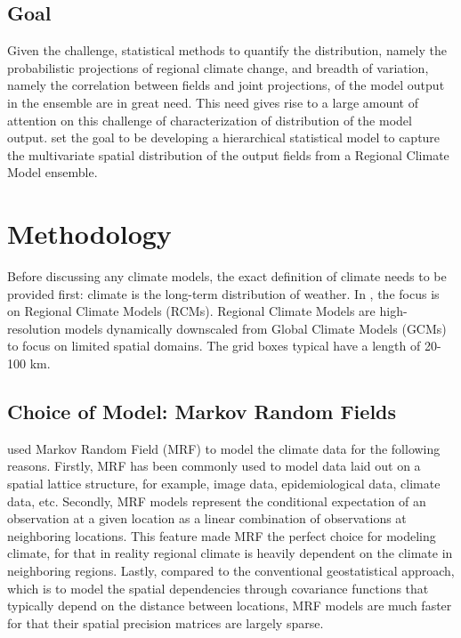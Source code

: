 \documentclass{article}
\begin{document}
\subsection{Goal}
Given the challenge, statistical methods to quantify the distribution, namely the probabilistic projections of regional climate change, and breadth of variation, namely the correlation between fields and joint projections, of the model output in the ensemble are in great need. This need gives rise to a large amount of attention on this challenge of characterization of distribution of the model output. \cite{paper} set the goal to be developing a hierarchical statistical model to capture the multivariate spatial distribution of the output fields from a Regional Climate Model ensemble.

\section{Methodology}
Before discussing any climate models, the exact definition of climate needs to be provided first: climate is the long-term distribution of weather. In \cite{paper}, the focus is on Regional Climate Models (RCMs). Regional Climate Models are high-resolution models dynamically downscaled from Global Climate Models (GCMs) to focus on limited spatial domains. The grid boxes typical have a length of 20-100 km. 

\subsection{Choice of Model: Markov Random Fields}
\cite{paper} used Markov Random Field (MRF) to model the climate data for the following reasons. Firstly, MRF has been commonly used to model data laid out on a spatial lattice structure, for example, image data, epidemiological data, climate data, etc. Secondly, MRF models represent the conditional expectation of an observation at a given location as a linear combination of observations at neighboring locations. This feature made MRF the perfect choice for modeling climate, for that in reality regional climate is heavily dependent on the climate in neighboring regions. Lastly, compared to the conventional geostatistical approach, which is to model the spatial dependencies through covariance functions that typically depend on the distance between locations, MRF models are much faster for that their spatial precision matrices are largely sparse.
\end{document}
